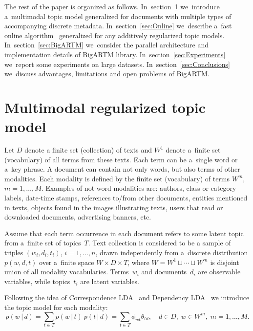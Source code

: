 \documentclass{llncs}
\newcommand{\cond}{\mspace{3mu}{|}\mspace{3mu}}
\begin{document}
The rest of the paper is organized as follows.
In~section~\ref{sec:Multimodal}
we~introduce a~multimodal topic model generalized for documents with multiple types of accompanying discrete metadata.
In~section~\ref{sec:Online}
we~describe a~fast online algorithm~\cite{hoffman10online} generalized for any additively regularized topic models.
In~section~\ref{sec:BigARTM}
we~consider the parallel architecture and implementation details of BigARTM library.
In~section~\ref{sec:Experiments}
we~report some experiments on large datasets.
In~section~\ref{sec:Conclusions}
we~discuss advantages, limitations and open problems of BigARTM.

\section{Multimodal regularized topic model}
\label{sec:Multimodal}


Let
$D$ denote a finite set (collection) of texts and
$W^1$ denote a~finite set (vocabulary) of all terms from these texts.
Each term can be a~single word or a~key phrase.
A document can contain not only words, but also terms of other modalities.
Each modality is defined by the finite set (vocabulary) of terms $W^m$, ${m=1,\dots,M}$.
Examples of not-word modalities are:
authors,
class or category labels,
date-time stamps,
references to/from other documents,
entities mentioned in texts,
objects found in the images illustrating texts,
users that read or downloaded documents,
advertising banners,
etc.

Assume that
each term occurrence in each document refers to some latent topic from a~finite set of topics~$T$.
Text collection is considered to be a sample of triples
$(w_i,d_i,t_i)$,\; ${i=1,\dots,n}$,
drawn independently from a~discrete distribution $p(w,d,t)$ over a~finite space $W\times D \times T$,
where ${W=W^1\sqcup\cdots\sqcup W^m}$ is disjoint union of all modality vocabularies.
Terms~$w_i$ and documents~$d_i$ are observable variables,
while topics~$t_i$ are latent variables.

Following the idea of Correspondence LDA~\cite{blei03modeling}
and Dependency LDA~\cite{rubin12statistical}
we introduce the topic model for each modality:
\[
    p(w\cond d)
    = \sum_{t\in T} p(w\cond t)\: p(t\cond d)
    = \sum_{t\in T} \phi_{wt} \theta_{td},
    \quad
    d\in D,\; w\in W^m,\; m=1,\dots,M.
\]
\end{document}
